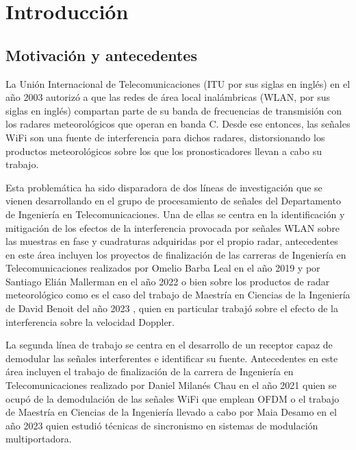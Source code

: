 \chapter{Introducción}
\label{Ch:1}
\graphicspath{{figs/}}

\section{Motivación y antecedentes}
\label{S:ch1-antecedentes}

La Unión Internacional de Telecomunicaciones (ITU por sus siglas en inglés) en el año 2003 autorizó a que las redes de área local inalámbricas (WLAN, por sus siglas en inglés) compartan parte de su banda de frecuencias de transmisión con los radares meteorológicos que operan en banda C. Desde ese entonces, las señales WiFi son una fuente de interferencia para dichos radares, distorsionando los productos meteorológicos sobre los que los pronosticadores llevan a cabo su trabajo.

Esta problemática ha sido disparadora de dos líneas de investigación que se vienen desarrollando en el grupo de procesamiento de señales del Departamento de Ingeniería en Telecomunicaciones. Una de ellas se centra en la identificación y mitigación de los
efectos de la interferencia provocada por señales WLAN sobre las muestras en fase y cuadraturas adquiridas por el propio radar, antecedentes en este área incluyen los proyectos de finalización de las carreras de Ingeniería en Telecomunicaciones realizados por Omelio Barba Leal en el año 2019 \cite{tesis-omelio} y por Santiago Elián Mallerman en el año 2022 \cite{tesis-santiago} o bien sobre los productos de radar meteorológico como es el caso del trabajo de Maestría en Ciencias de la Ingeniería de David Benoit del año 2023 \cite{tesis-david}, quien en particular trabajó sobre el efecto de la interferencia sobre la velocidad Doppler.

La segunda línea de trabajo se centra en el desarrollo de un receptor capaz de demodular las señales interferentes e identificar su fuente. Antecedentes en este área incluyen el trabajo de finalización de la carrera de Ingeniería en Telecomunicaciones realizado por Daniel Milanés Chau en el año 2021 \cite{tesis-daniel} quien se ocupó de la demodulación de las señales WiFi que emplean OFDM o el trabajo de Maestría en Ciencias de la Ingeniería llevado a cabo por Maia Desamo en el año 2023 \cite{tesis-maia} quien estudió técnicas de sincronismo en sistemas de modulación multiportadora.

